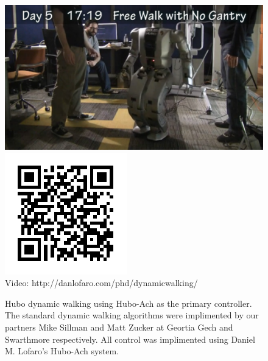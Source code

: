 \begin{figure}[thpb]
  \centering
      \includegraphics[width=0.93\columnwidth]{./examples/pix/dynamicwalking.png}
      \includegraphics{./qrcode/qrcode-dynamicwalking.png}\\
      Video: http://danlofaro.com/phd/dynamicwalking/
\caption{Hubo dynamic walking using Hubo-Ach as the primary controller.  The standard dynamic walking algorithms were implimented by our partners Mike Sillman and Matt Zucker at Geortia Gech and Swarthmore respectively.  All control was implimented using Daniel M. Lofaro's Hubo-Ach system.}
  \label{fig:dynamicwalking}
\end{figure}
